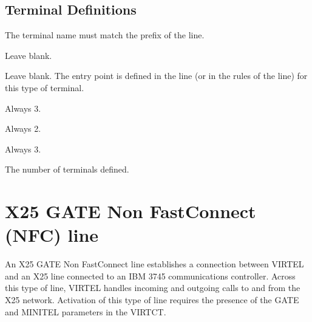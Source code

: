 \documentclass[letterpaper,10pt,english]{sphinxmanual}
\begin{document}
\subsection{Terminal Definitions}
\label{\detokenize{connectivity_guide:index-60}}\label{\detokenize{connectivity_guide:id27}}\begin{description}
\sphinxAtStartPar
The terminal name must match the prefix of the line.

\sphinxAtStartPar
Leave blank.

\sphinxAtStartPar
Leave blank. The entry point is defined in the line (or in the rules of the line) for this type of terminal.

\sphinxAtStartPar
Always 3.

\sphinxAtStartPar
Always 2.

\sphinxAtStartPar
Always 3.

\sphinxAtStartPar
The number of terminals defined.

\end{description}

\newpage

\ignorespaces 

\section{X25 GATE Non Fast\sphinxhyphen{}Connect (NFC) line}
\label{\detokenize{connectivity_guide:x25-gate-non-fast-connect-nfc-line}}\label{\detokenize{connectivity_guide:v461cn-x25gateline}}\label{\detokenize{connectivity_guide:index-61}}
\sphinxAtStartPar
An X25 GATE Non Fast\sphinxhyphen{}Connect line establishes a connection between VIRTEL and an X25 line connected to an IBM 3745 communications controller. Across this type of line, VIRTEL handles incoming and outgoing calls to and from the X25 network. Activation of this type of line requires the presence of the GATE and MINITEL parameters in the VIRTCT.

\sphinxAtStartPar
{}
\end{document}
